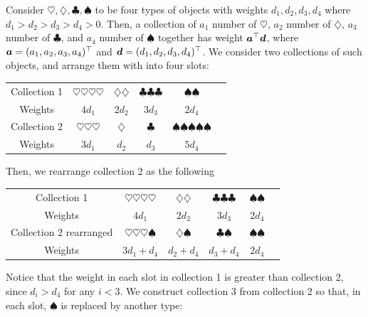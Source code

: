 \documentclass[runningheads]{llncs}
\begin{document}
\begin{example}\label{example: rearrange weights}
Consider $\heartsuit, \diamondsuit, \clubsuit, \spadesuit$ to be four types of objects with weights $d_1, d_2, d_3, d_4$ where $d_1>d_2>d_3>d_4>0$. Then, a collection of $a_1$ number of $\heartsuit$, $a_2$ number of $\diamondsuit$, $a_3$ number of $\clubsuit$, and $a_4$ number of $\spadesuit$ together has weight $\boldsymbol a^\top\boldsymbol d$, where $\boldsymbol a = (a_1, a_2, a_3, a_4)^\top$ and $\boldsymbol d = (d_1,d_2,d_3,d_4)^\top$. We consider two collections of such objects, and arrange them with into four slots: 
\begin{center}
    \begin{tabular}{c|c|c|c|c|c}
    Collection 1 & $\heartsuit\heartsuit\heartsuit\heartsuit$ & $\diamondsuit\diamondsuit$ & $\clubsuit\clubsuit\clubsuit$ & $\spadesuit\spadesuit$ & \\
    Weights & $4d_1$ & $2d_2$ & $3d_3$ & $2d_4$ & \\\hline
    Collection 2 & $\heartsuit\heartsuit\heartsuit$ & $\diamondsuit$ & $\clubsuit$ & $\spadesuit\spadesuit\spadesuit\spadesuit\spadesuit$ & \\
    Weights & $3d_1$ & $d_2$ & $d_3$ & $5d_4$ & \\
\end{tabular}
\end{center}
Then, we rearrange collection 2 as the following
\begin{center}
\begin{tabular}{c|c|c|c|c|c}
    Collection 1 & $\heartsuit\heartsuit\heartsuit\heartsuit$ & $\diamondsuit\diamondsuit$ & $\clubsuit\clubsuit\clubsuit$ & $\spadesuit\spadesuit$ & \\
    Weights & $4d_1$ & $2d_2$ & $3d_3$ & $2d_4$ & \\\hline
    Collection 2 rearranged & $\heartsuit\heartsuit\heartsuit\spadesuit$ & $\diamondsuit\spadesuit$ & $\clubsuit\spadesuit$ & $\spadesuit\spadesuit$ & \\
    Weights & $3d_1 + d_4$ & $d_2 + d_4$ & $d_3+d_4$ & $2d_4$ & \\
\end{tabular}
\end{center}
Notice that the weight in each slot in collection 1 is greater than collection 2, since $d_i> d_4$ for any $i<3$. 
We construct collection 3 from collection 2 so that, in each slot,  $\spadesuit$ is replaced by another type: 
\begin{center}
\begin{tabular}{c|c|c|c|c|c}

\end{tabular}
\end{center}
\end{example}
\end{document}
